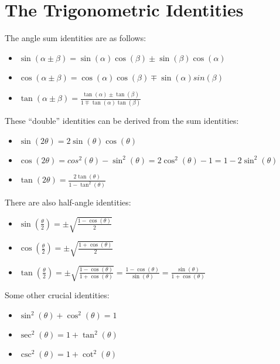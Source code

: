 \documentclass{report}
\begin{document}
\section{The Trigonometric Identities}

\noindent The angle sum identities are as follows:
\begin{itemize}
    \item \(\sin(\alpha\pm\beta)=\sin(\alpha)\cos(\beta)\pm\sin(\beta)\cos(\alpha)\)
    \item \(\cos(\alpha\pm\beta)=\cos(\alpha)\cos(\beta)\mp\sin(\alpha)sin(\beta)\)
    \item \(\tan(\alpha\pm\beta)=\frac{\tan(\alpha)\pm\tan(\beta)}{1\mp\tan(\alpha)\tan(\beta)}\)
\end{itemize}

\noindent These ``double'' identities can be derived from the sum identities:
\begin{itemize}
    \item \(\sin(2\theta)=2\sin(\theta)\cos(\theta)\)
    \item \(\cos(2\theta)=cos^2(\theta)-\sin^2(\theta)=2\cos^2(\theta)-1=1-2\sin^2(\theta)\)
    \item \(\tan(2\theta)=\frac{2\tan(\theta)}{1-\tan^2(\theta)}\)
\end{itemize}

\noindent There are also half-angle identities:
\begin{itemize}
    \item \(\sin(\frac{\theta}{2})=\pm\sqrt{\frac{1-\cos(\theta)}{2}}\)
    \item \(\cos(\frac{\theta}{2})=\pm\sqrt{\frac{1+\cos(\theta)}{2}}\)
    \item \(\tan(\frac{\theta}{2})=\pm\sqrt{\frac{1-\cos(\theta)}{1+\cos(\theta)}}=\frac{1-\cos(\theta)}{\sin(\theta)}=\frac{\sin(\theta)}{1+\cos(\theta)}\)
\end{itemize}

\noindent Some other crucial identities:
\begin{itemize}
    \item \(\sin^2(\theta)+\cos^2(\theta)=1\)
    \item \(\sec^2(\theta)=1+\tan^2(\theta)\)
    \item \(\csc^2(\theta)=1+\cot^2(\theta)\)
\end{itemize}
\end{document}
